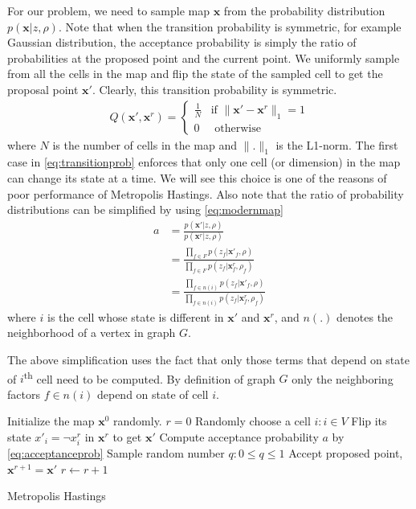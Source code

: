 \documentclass[letterpaper, 10 pt, conference]{ieeeconf} %
\newcommand{\vect}[1]{\mathbf{#1}}
\begin{document}
For our problem, we need to sample map $\vect{x}$ from the probability
distribution $p(\vect{x}|z, \rho)$. Note that when the transition probability
is symmetric, for example Gaussian distribution, the acceptance probability is
simply the ratio of probabilities at the proposed point and the current point.
We uniformly sample from all the cells in the map and flip the state of the
sampled cell to get the proposal point $\vect{x}'$. Clearly, this transition probability is symmetric.
\begin{align}
  Q(\vect{x}', \vect{x}^r) = \begin{cases}
    \frac{1}{N} & \text{if $\|\vect{x}' - \vect{x}^r\|_1 = 1$}\\
      0 & \text{ otherwise}
  \end{cases}
  \label{eq:transitionprob}
\end{align}
where $N$ is the number of cells in the map and $\|.\|_1$ is the L1-norm. The
first case in \eqref{eq:transitionprob} enforces that only one cell (or dimension)
in the map
can change its state at a time. We will see this choice is one of the reasons of
poor performance of Metropolis Hastings. Also note that the ratio of probability distributions can be simplified by using \eqref{eq:modernmap}
\begin{align}
  a &= \frac{p(\vect{x}'|z,\rho)}{p(\vect{x}^r|z, \rho)}\\
    &= \frac{\prod_{f \in F} p(z_f|\vect{x}'_f, \rho)}{\prod_{f \in F}p(z_f|\vect{x}^r_f, \rho_f)}\\
    &= \frac{\prod_{f \in n(i)} p(z_f|\vect{x}'_f, \rho)}{\prod_{f \in n(i)}p(z_f|\vect{x}^r_f, \rho_f)}
  \label{eq:acceptanceprob}
\end{align}
where $i$ is the cell whose state is different in $\vect{x}'$ and $\vect{x}^r$,
and $n(.)$ denotes the neighborhood of a vertex in graph $G$.

The above simplification uses the fact that only those terms  that depend on
state of $i$\textsuperscript{th} cell need to be computed. By definition
of graph $G$ only the neighboring factors $f \in n(i)$ depend on state of cell $i$.

% 
\begin{algorithm}
  Initialize the map $\vect{x}^0$ randomly.\;
  $r = 0$\;
   {
    Randomly choose a cell $i : i \in V$\;
    Flip its state $x'_i = \neg x^r_i$ in $\vect{x}^r$ to get $\vect{x}'$\;
    Compute acceptance probability $a$ by \eqref{eq:acceptanceprob}\;
    Sample random number $q : 0 \le q \le 1$\;
     {
      Accept proposed point, $\vect{x}^{r + 1} = \vect{x}'$\;
    } \Else {
      Reject proposed point, $\vect{x}^{r + 1} = \vect{x}^r$\;
    }
    $r \leftarrow r + 1$\;
  }
  \caption{Metropolis Hastings}
\end{algorithm}
\end{document}
